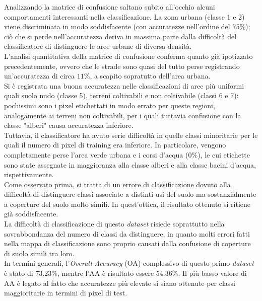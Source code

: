 Analizzando la matrice di confusione saltano subito all'occhio alcuni
comportamenti interessanti nella classificazione. La zona urbana
(classe 1 e 2) viene discriminata in modo soddisfacente (con
accuratezze nell'ordine del $75\%$); ciò che si perde nell'accuratezza
deriva in massima parte dalla difficoltà del classificatore di
distinguere le aree urbane di diversa densità.\\

L'analisi quantitativa della matrice di confusione conferma quanto già
ipotizzato precedentemente, ovvero che le strade sono quasi del tutto
perse registrando un'accuratezza di circa $11\%$, a scapito sopratutto
dell'area urbana. \\

Si è registrata una buona accuratezza nelle classificazioni di aree
più uniformi quali suolo nudo (classe 5), terreni coltivabili e non
coltivabile (classi 6 e 7): pochissimi sono i pixel etichettati in
modo errato per queste regioni, analogamente ai terreni non
coltivabili, per i quali tuttavia confusione con la classe "alberi"
causa accuratezza inferiore.\\

Tuttavia, il classificatore ha avuto serie difficoltà in quelle classi
minoritarie per le quali il numero di pixel di training era inferiore.
In particolare, vengono completamente perse l'area verde urbana e i
corsi d'acqua ($0\%$), le cui etichette sono state assegnate in
maggioranza alla classe alberi e alla classe bacini d'acqua,
rispettivamente.\\

Come osservato prima, si tratta di un errore di classificazione dovuto
alla difficoltà di distinguere classi associate a distinti usi del
suolo ma sostanzialmente a coperture del suolo molto simili. In
quest'ottica, il risultato ottenuto si ritiene già soddisfacente.\\

La difficoltà di classificazione di questo \emph{dataset} risiede
soprattutto nella sovrabbondanza del numero di classi da distinguere,
in quanto molti errori fatti nella mappa di classificazione sono
proprio causati dalla confusione di coperture di suolo simili tra
loro.\\

In termini generali, l'\emph{Overall Accuracy} (OA) complessivo di
questo primo \emph{dataset} è stato di $73.23\%$, mentre l'AA è
risultato essere $54.36\%$. Il più basso valore di AA è legato al
fatto che accuratezze più elevate si siano ottenute per classi
maggioritarie in termini di pixel di test.\\

